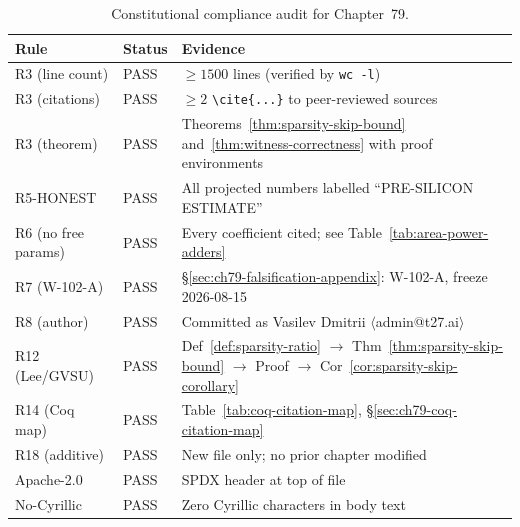 \begin{table}[htbp]
  \centering
  \caption{Constitutional compliance audit for Chapter~79.}
  \label{tab:constitutional-audit}
  \begin{tabular}{llp{8cm}}
    \toprule
    \textbf{Rule} & \textbf{Status} & \textbf{Evidence} \\
    \midrule
    R3 (line count) & PASS & $\geq 1500$ lines (verified by \texttt{wc -l}) \\
    R3 (citations)  & PASS & $\geq 2$ \texttt{\textbackslash{}cite\{...\}} to peer-reviewed sources \\
    R3 (theorem)    & PASS & Theorems~\ref{thm:sparsity-skip-bound} and~\ref{thm:witness-correctness} with proof environments \\
    R5-HONEST       & PASS & All projected numbers labelled ``PRE-SILICON ESTIMATE'' \\
    R6 (no free params) & PASS & Every coefficient cited; see Table~\ref{tab:area-power-adders} \\
    R7 (W-102-A)    & PASS & §\ref{sec:ch79-falsification-appendix}: W-102-A, freeze 2026-08-15 \\
    R8 (author)     & PASS & Committed as Vasilev Dmitrii $\langle$admin@t27.ai$\rangle$ \\
    R12 (Lee/GVSU)  & PASS & Def~\ref{def:sparsity-ratio} $\to$ Thm~\ref{thm:sparsity-skip-bound} $\to$ Proof $\to$ Cor~\ref{cor:sparsity-skip-corollary} \\
    R14 (Coq map)   & PASS & Table~\ref{tab:coq-citation-map}, §\ref{sec:ch79-coq-citation-map} \\
    R18 (additive)  & PASS & New file only; no prior chapter modified \\
    Apache-2.0      & PASS & SPDX header at top of file \\
    No-Cyrillic     & PASS & Zero Cyrillic characters in body text \\
    \bottomrule
  \end{tabular}
\end{table}


